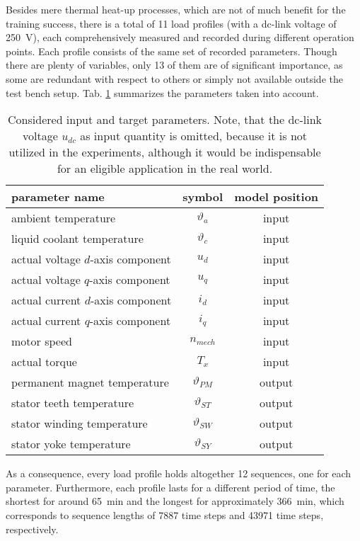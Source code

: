Besides mere thermal heat-up processes, which are not of much benefit for the training success, there is a total of 11 load profiles (with a dc-link voltage of \SI{250}{\volt}), each comprehensively measured and recorded during different operation points.
Each profile consists of the same set of recorded parameters.
Though there are plenty of variables, only 13 of them are of significant importance, as some are redundant with respect to others or simply not available outside the test bench setup.
Tab. \ref{tab:params} summarizes the parameters taken into account.
\begin{table}
	\caption{Considered input and target parameters. Note, that the dc-link voltage $u_{dc}$ as input quantity is omitted, because it is not utilized in the experiments, although it would be indispensable for an eligible application in the real world.}
	\label{tab:params}
	\centering
	\begin{tabular}{l c c}
		\toprule
		parameter name & symbol & model position \\
		\midrule
		ambient temperature & $\vartheta_a$ & input \\
		liquid coolant temperature & $\vartheta_c$ & input \\
		actual voltage $d$-axis component & $u_d$ & input \\
		actual voltage $q$-axis component & $u_q$ & input \\
		actual current $d$-axis component & $i_d$ & input \\
		actual current $q$-axis component & $i_q$ & input \\
		motor speed & $n_{mech}$ & input \\
		actual torque & $T_x$ & input \\
		\hline
		permanent magnet temperature & $\vartheta_{PM}$ & output \\
		stator teeth temperature & $\vartheta_{ST}$ & output \\
		stator winding temperature & $\vartheta_{SW}$ & output \\
		stator yoke temperature & $\vartheta_{SY}$ & output\\
		\bottomrule
	 \end{tabular}
\end{table}
As a consequence, every load profile holds altogether 12 sequences, one for each parameter.
Furthermore, each profile lasts for a different period of time, the shortest for around \SI{65}{\minute} and the longest for approximately \SI{366}{\minute}, which corresponds to sequence lengths of 7887 time steps and 43971 time steps, respectively.

